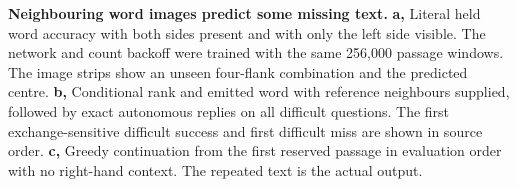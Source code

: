 \textbf{Neighbouring word images predict some missing text.} \textbf{a,} Literal held word accuracy with both sides present and with only the left side visible. The network and count backoff were trained with the same 256,000 passage windows. The image strips show an unseen four-flank combination and the predicted centre. \textbf{b,} Conditional rank and emitted word with reference neighbours supplied, followed by exact autonomous replies on all difficult questions. The first exchange-sensitive difficult success and first difficult miss are shown in source order. \textbf{c,} Greedy continuation from the first reserved passage in evaluation order with no right-hand context. The repeated text is the actual output.
